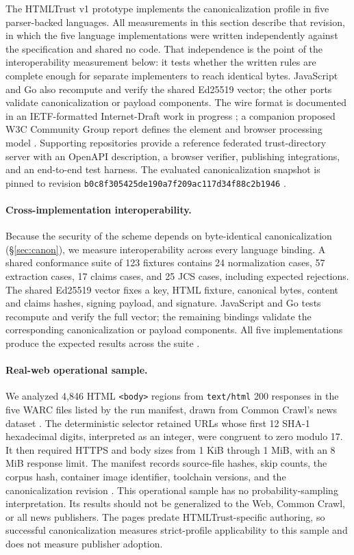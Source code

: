 \documentclass{article}
\begin{document}
The HTMLTrust v1 prototype implements the canonicalization profile in five parser-backed languages. All measurements in this section describe that revision, in which the five language implementations were written independently against the specification and shared no code. That independence is the point of the interoperability measurement below: it tests whether the written rules are complete enough for separate implementers to reach identical bytes. JavaScript and Go also recompute and verify the shared Ed25519 vector; the other ports validate canonicalization or payload components. The wire format is documented in an IETF-formatted Internet-Draft work in progress \cite{HTMLTrustDraft}; a companion proposed W3C Community Group report defines the element and browser processing model \cite{HTMLTrustW3C}. Supporting repositories provide a reference federated trust-directory server with an OpenAPI description, a browser verifier, publishing integrations, and an end-to-end test harness. The evaluated canonicalization snapshot is pinned to revision \nolinkurl{b0c8f305425de190a7f209ac117d34f88c2b1946} \cite{HTMLTrustCanon}.

\paragraph{Cross-implementation interoperability.} Because the security of the scheme depends on byte-identical canonicalization (\S\ref{sec:canon}), we measure interoperability across every language binding. A shared conformance suite of 123 fixtures contains 24 normalization cases, 57 extraction cases, 17 claims cases, and 25 JCS cases, including expected rejections. The shared Ed25519 vector fixes a key, HTML fixture, canonical bytes, content and claims hashes, signing payload, and signature. JavaScript and Go tests recompute and verify the full vector; the remaining bindings validate the corresponding canonicalization or payload components. All five implementations produce the expected results across the suite \cite{HTMLTrustCanon}.

\paragraph{Real-web operational sample.} We analyzed 4{,}846 HTML \texttt{<body>} regions from \texttt{text/html} 200 responses in the five WARC files listed by the run manifest, drawn from Common Crawl's news dataset \cite{CommonCrawlNews}. The deterministic selector retained URLs whose first 12 SHA-1 hexadecimal digits, interpreted as an integer, were congruent to zero modulo 17. It then required HTTPS and body sizes from 1 KiB through 1 MiB, with an 8 MiB response limit. The manifest records source-file hashes, skip counts, the corpus hash, container image identifier, toolchain versions, and the canonicalization revision \cite{HTMLTrustStudy1}. This operational sample has no probability-sampling interpretation. Its results should not be generalized to the Web, Common Crawl, or all news publishers. The pages predate HTMLTrust-specific authoring, so successful canonicalization measures strict-profile applicability to this sample and does not measure publisher adoption.
\end{document}
